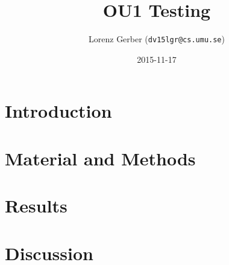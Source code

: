 \documentclass[a4paper,11pt,twoside]{article}
\title{OU1 Testing}
\author{Lorenz Gerber  ({\tt{dv15lgr@cs.umu.se}})}
\date{2015-11-17}
\begin{document}
\maketitle

\tableofcontents

\section{Introduction} 

\section{Material and Methods} 

\section{Results} 

\section{Discussion} 


\end{document}
